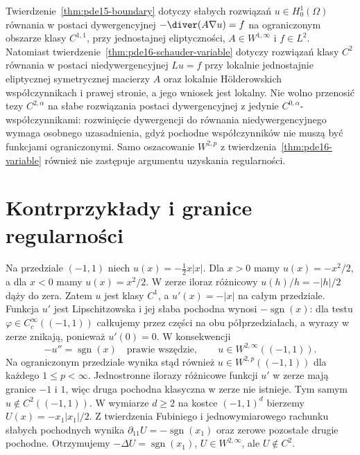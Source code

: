 \begin{uwaga}
\label{rem:pde-v42-two-regularity-classes}
Twierdzenie~\ref{thm:pde15-boundary} dotyczy słabych
rozwiązań $u\in H_0^1(\Omega)$ równania w postaci
dywergencyjnej $-\diver(A\nabla u)=f$ na ograniczonym
obszarze klasy $C^{1,1}$, przy jednostajnej eliptyczności,
$A\in W^{1,\infty}$ i $f\in L^2$.
Natomiast twierdzenie~\ref{thm:pde16-schauder-variable}
dotyczy rozwiązań klasy $C^2$ równania
w postaci niedywergencyjnej $Lu=f$ przy lokalnie
jednostajnie eliptycznej symetrycznej macierzy $A$
oraz lokalnie Hölderowskich współczynnikach i prawej
stronie, a jego wniosek jest lokalny.
Nie wolno przenosić tezy $C^{2,\alpha}$ na słabe
rozwiązania postaci dywergencyjnej z jedynie
$C^{0,\alpha}$-współczynnikami: rozwinięcie dywergencji
do równania niedywergencyjnego wymaga osobnego
uzasadnienia, gdyż pochodne współczynników nie muszą
być funkcjami ograniczonymi. Samo oszacowanie
$W^{2,p}$ z twierdzenia~\ref{thm:pde16-variable}
również nie zastępuje argumentu uzyskania regularności.
\end{uwaga}

\section{Kontrprzykłady i granice regularności}
\begin{kontrprzyklad}
Na przedziale $(-1,1)$ niech $u(x)=-\tfrac12x|x|$.
Dla $x>0$ mamy $u(x)=-x^2/2$, a dla $x<0$
mamy $u(x)=x^2/2$. W zerze iloraz różnicowy
$u(h)/h=-|h|/2$ dąży do zera.
Zatem $u$ jest klasy $C^1$, a $u'(x)=-|x|$ na całym
przedziale. Funkcja $u'$ jest Lipschitzowska i jej
słaba pochodna wynosi $-\operatorname{sgn}(x)$:
dla testu $\varphi\in C_c^\infty((-1,1))$
całkujemy przez części na obu półprzedziałach,
a wyrazy w zerze znikają, ponieważ $u'(0)=0$.
W konsekwencji
\[
 -u''=\operatorname{sgn}(x)\quad\text{prawie wszędzie},
 \qquad u\in W^{2,\infty}((-1,1)).
\]
Na ograniczonym przedziale wynika stąd również
$u\in W^{2,p}((-1,1))$ dla każdego $1\le p<\infty$.
Jednostronne ilorazy różnicowe funkcji $u'$ w zerze
mają granice $-1$ i $1$, więc druga pochodna klasyczna
w zerze nie istnieje. Tym samym $u\notin C^2((-1,1))$.
W wymiarze $d\ge2$ na kostce $(-1,1)^d$ bierzemy
$U(x)=-x_1|x_1|/2$. Z twierdzenia Fubiniego
i jednowymiarowego rachunku słabych pochodnych
wynika $\partial_{11}U=-\operatorname{sgn}(x_1)$
oraz zerowe pozostałe drugie pochodne.
Otrzymujemy $-\Delta U=\operatorname{sgn}(x_1)$,
$U\in W^{2,\infty}$, ale $U\notin C^2$.
\end{kontrprzyklad}

